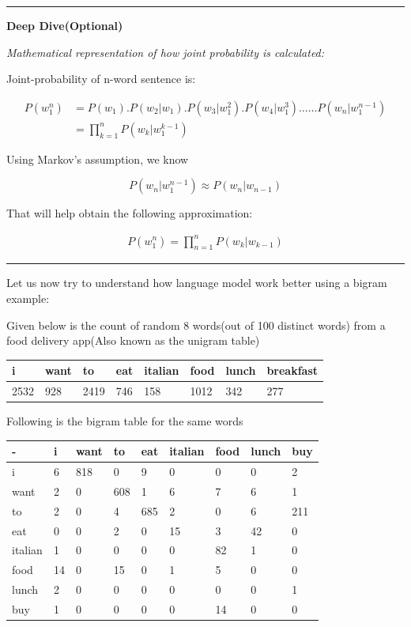 \documentclass[11pt]{article}
\begin{document}
\begin{center}\rule{0.5\linewidth}{\linethickness}\end{center}

\textbf{Deep Dive(Optional)}

\emph{Mathematical representation of how joint probability is
calculated:}

Joint-probability of n-word sentence is:

\[ \begin{align} P(w_1^n) &= P(w_1).P(w_2 | w_1).P(w_3 | w_1^2).P(w_4 | w_1^3) \dots\dots P(w_n | w_1^{n-1})\\
 &= \prod_{k=1}^{n}P(w_k|w_1^{k-1}) \end{align} \]

Using Markov's assumption, we know

\[ P(w_n |w^{n−1}_1 ) \approx P(w_n |w_{n−1} ) \]

That will help obtain the following approximation:

\begin{align} P(w_1^n) = \prod_{n=1}^{n}P(w_k|w_{k-1}) \end{align}

\begin{center}\rule{0.5\linewidth}{\linethickness}\end{center}

Let us now try to understand how language model work better using a
bigram example:

Given below is the count of random 8 words(out of 100 distinct words)
from a food delivery app(Also known as the unigram table)

\begin{longtable}[]{@{}llllllll@{}}
\toprule
i & want & to & eat & italian & food & lunch & breakfast\tabularnewline
\midrule
\endhead
2532 & 928 & 2419 & 746 & 158 & 1012 & 342 & 277\tabularnewline
\bottomrule
\end{longtable}

Following is the bigram table for the same words

\begin{longtable}[]{@{}lllllllll@{}}
\toprule
- & i & want & to & eat & italian & food & lunch & buy\tabularnewline
\midrule
\endhead
i & 6 & 818 & 0 & 9 & 0 & 0 & 0 & 2\tabularnewline
want & 2 & 0 & 608 & 1 & 6 & 7 & 6 & 1\tabularnewline
to & 2 & 0 & 4 & 685 & 2 & 0 & 6 & 211\tabularnewline
eat & 0 & 0 & 2 & 0 & 15 & 3 & 42 & 0\tabularnewline
italian & 1 & 0 & 0 & 0 & 0 & 82 & 1 & 0\tabularnewline
food & 14 & 0 & 15 & 0 & 1 & 5 & 0 & 0\tabularnewline
lunch & 2 & 0 & 0 & 0 & 0 & 0 & 0 & 1\tabularnewline
buy & 1 & 0 & 0 & 0 & 0 & 14 & 0 & 0\tabularnewline
\bottomrule
\end{longtable}
\end{document}
